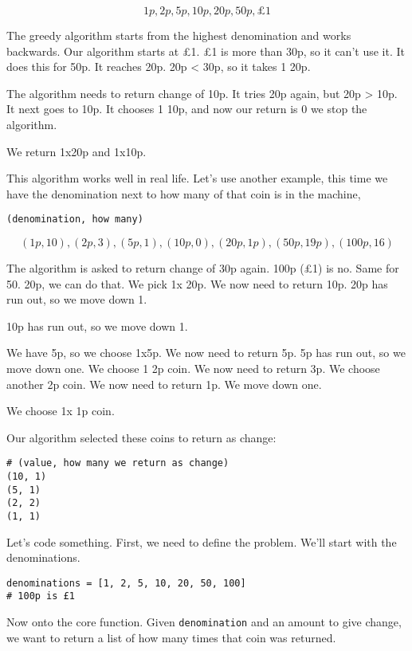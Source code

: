 \documentclass{article}
\newcommand{\code}[1]{\texttt{#1}}
\begin{document}
$$1p, 2p, 5p, 10p, 20p, 50p, \pounds 1$$

The greedy algorithm starts from the highest denomination and works backwards. Our algorithm starts at £1. £1 is more than 30p, so it can't use it. It does this for 50p. It reaches 20p. 20p < 30p, so it takes 1 20p.

The algorithm needs to return change of 10p. It tries 20p again, but 20p > 10p. It next goes to 10p. It chooses 1 10p, and now our return is 0 we stop the algorithm.

We return 1x20p and 1x10p.

This algorithm works well in real life. Let's use another example, this time we have the denomination next to how many of that coin is in the machine, 

\begin{verbatim}
(denomination, how many)
\end{verbatim}
$$(1p, 10), (2p, 3), (5p, 1), (10p, 0), (20p, 1p), (50p, 19p), (100p, 16)$$

The algorithm is asked to return change of 30p again. 100p (£1) is no. Same for 50. 20p, we can do that. We pick 1x 20p. We now need to return 10p. 20p has run out, so we move down 1.

10p has run out, so we move down 1.

We have 5p, so we choose 1x5p. We now need to return 5p. 5p has run out, so we move down one.
We choose 1 2p coin. We now need to return 3p. We choose another 2p coin. We now need to return 1p. We move down one.

We choose 1x 1p coin. 

Our algorithm selected these coins to return as change:

\begin{verbatim}
# (value, how many we return as change)
(10, 1)
(5, 1)
(2, 2)
(1, 1)
\end{verbatim}
 
 Let's code something. First, we need to define the problem. We'll start with the denominations.
 
 \begin{verbatim}
denominations = [1, 2, 5, 10, 20, 50, 100]
# 100p is £1
\end{verbatim}
 
 Now onto the core function. Given \code{denomination} and an amount to give change, we want to return a list of how many times that coin was returned. 
 
\end{document}
